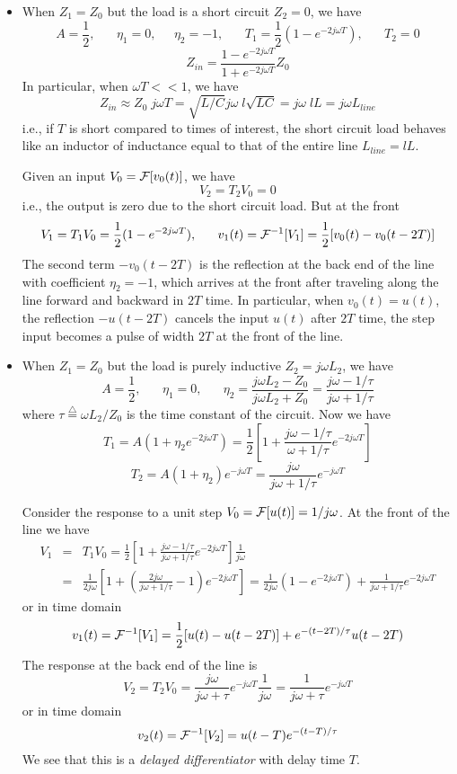 \begin{itemize}
\item When $Z_1=Z_0$ but the load is a short circuit $Z_2=0$, we have
  \[	A=\frac{1}{2},\;\;\;\;\;\;\eta_1=0,\;\;\;\;\;\eta_2=-1,
  \;\;\;\;\;\; T_1=\frac{1}{2}(1-e^{-2j\omega T}),\;\;\;\;\;\;T_2=0 \]
  \[ Z_{in}=\frac{1-e^{-2j\omega T}}{1+e^{-2j\omega T}}Z_0 \]
  In particular, when $\omega T << 1$, we have
  \[ Z_{in}\approx Z_0 \;j\omega T=\sqrt{L/C}j\omega\;l\sqrt{LC}
  =j\omega\;lL=j\omega L_{line}	\]
  i.e., if $T$ is short compared to times of interest, the short
  circuit load behaves like an inductor of inductance equal to that of 
  the entire line $L_{line}=lL$.

  Given an input $V_0={\cal F}[v_0(t)]$, we have
  \[	V_2=T_2V_0=0	\]
  i.e., the output is zero due to the short circuit load. But at the front
  \[	V_1=T_1V_0=\frac{1}{2}(1-e^{-2j\omega T}),\;\;\;\;\;\;
  v_1(t)={\cal F}^{-1}[V_1]=\frac{1}{2}[v_0(t)-v_0(t-2T)]	\]
  The second term $-v_0(t-2T)$ is the reflection at the back end of the line 
  with coefficient $\eta_2=-1$, which arrives at the front after traveling along 
  the line forward and backward in $2T$ time. In particular, when $v_0(t)=u(t)$,
  the reflection $-u(t-2T)$ cancels the input $u(t)$ after $2T$ time, the step
  input becomes a pulse of width $2T$ at the front of the line.

\item When $Z_1=Z_0$ but the load is purely inductive $Z_2=j\omega L_2$, we have
  \[	A=\frac{1}{2},\;\;\;\;\;\;\eta_1=0,\;\;\;\;\;\;
  \eta_2=\frac{j\omega L_2-Z_0}{j\omega L_2+Z_0}=\frac{j\omega-1/\tau}{j\omega+1/\tau} \]
  where $\tau\stackrel{\triangle}{=}\omega L_2/Z_0$ is the time constant of the
  circuit. Now we have
  \[ T_1=A(1+\eta_2e^{-2j\omega T})
  =\frac{1}{2}\left[1+\frac{j\omega-1/\tau}{\omega+1/\tau} e^{-2j\omega T}\right] \]
  \[ T_2=A(1+\eta_2)e^{-j\omega T}=\frac{j\omega}{j\omega+1/\tau}e^{-j\omega T} \]

  Consider the response to a unit step $V_0={\cal F}[u(t)]=1/j\omega$.
  At the front of the line we have
  \begin{eqnarray}
    V_1 & = & T_1V_0
    =\frac{1}{2}\left[1+\frac{j\omega-1/\tau}{j\omega+1/\tau}e^{-2j\omega T}\right]\frac{1}{j\omega}
    \nonumber \\
    &=&\frac{1}{2j\omega}\left[1+\left(\frac{2j\omega}{j\omega+1/\tau}-1\right)e^{-2j\omega T}\right]
    =\frac{1}{2j\omega}\left(1-e^{-2j\omega T}\right)+\frac{1}{j\omega+1/\tau}e^{-2j\omega T}
    \nonumber 
  \end{eqnarray}
  or in time domain
  \[	v_1(t)={\cal F}^{-1}[V_1]=\frac{1}{2}[u(t)-u(t-2T)]+e^{-(t-2T)/\tau} u(t-2T) \]
  The response at the back end of the line is
  \[ 	V_2=T_2V_0=\frac{j\omega}{j\omega+\tau}e^{-j\omega T} \frac{1}{j\omega}
  =\frac{1}{j\omega+\tau}e^{-j\omega T} \]
  or in time domain
  \[	v_2(t)={\cal F}^{-1}[V_2]=u(t-T) e^{-(t-T)/\tau} 	\]
  We see that this is a {\em delayed differentiator} with delay time $T$. 


\end{itemize}
